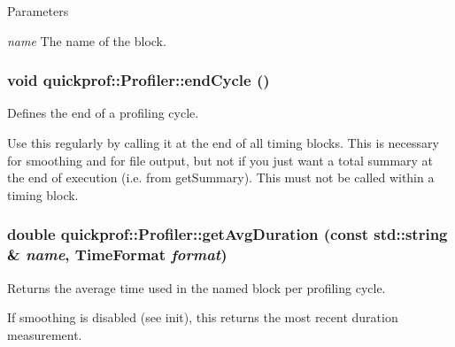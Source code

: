 \begin{DoxyParams}{Parameters}
\item[{\em name}]The name of the block. \end{DoxyParams}
\hypertarget{classquickprof_1_1_profiler_a158610937cac5c9efcb36534c1c47f76}{
\subsubsection[{endCycle}]{\setlength{\rightskip}{0pt plus 5cm}void quickprof::Profiler::endCycle ()}}
\label{classquickprof_1_1_profiler_a158610937cac5c9efcb36534c1c47f76}
Defines the end of a profiling cycle.

Use this regularly by calling it at the end of all timing blocks. This is necessary for smoothing and for file output, but not if you just want a total summary at the end of execution (i.e. from getSummary). This must not be called within a timing block. \hypertarget{classquickprof_1_1_profiler_aeac4d5f0f3c8aab4ca1c51b4ddf7601d}{
\subsubsection[{getAvgDuration}]{\setlength{\rightskip}{0pt plus 5cm}double quickprof::Profiler::getAvgDuration (const std::string \& {\em name}, \/  {\bf TimeFormat} {\em format})}}
\label{classquickprof_1_1_profiler_aeac4d5f0f3c8aab4ca1c51b4ddf7601d}
Returns the average time used in the named block per profiling cycle.

If smoothing is disabled (see init), this returns the most recent duration measurement.


